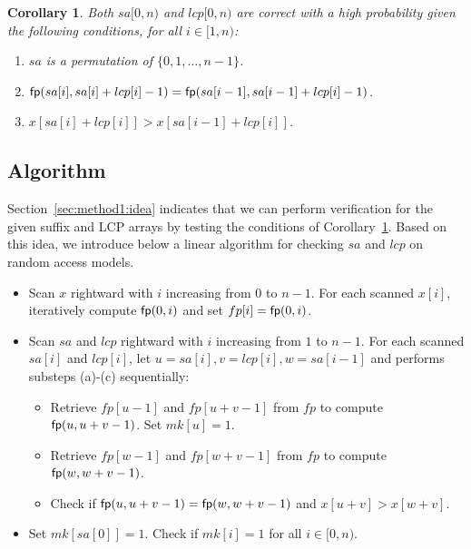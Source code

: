 \documentclass[10pt,journal,compsoc]{IEEEtran}
\newtheorem{Corollary}{Corollary}
\begin{document}
\begin{Corollary} \label{corollary:1}
	Both $sa[0, n)$ and $lcp[0, n)$ are correct with a high probability given the following conditions, for all $i \in [1, n)$:
	
	\begin{enumerate}[(1)]
		\item
		$sa$ is a permutation of $\{0, 1, \dots, n - 1\}$.
		
		\item
		${\sf fp}(sa[i], sa[i] + lcp[i] - 1) = {\sf fp}(sa[i - 1], sa[i - 1] + lcp[i] - 1)$.
		
		\item
		$x[sa[i] + lcp[i]] > x[sa[i - 1] + lcp[i]]$.
	\end{enumerate}
\end{Corollary}


\subsection{Algorithm} \label{sec:method1:algorithm}

Section~\ref{sec:method1:idea} indicates that we can perform verification for the given suffix and LCP arrays by testing the conditions of Corollary~\ref{corollary:1}. Based on this idea, we introduce below a linear algorithm for checking $sa$ and $lcp$ on random access models.

\begin{itemize}
	\item [S1]
	Scan $x$ rightward with $i$ increasing from $0$ to $n - 1$. For each scanned $x[i]$, iteratively compute ${\sf fp}(0, i)$ and set $fp[i] = {\sf fp}(0, i)$.
	
	\item [S2]
	Scan $sa$ and $lcp$ rightward with $i$ increasing from $1$ to $n - 1$. For each scanned $sa[i]$ and $lcp[i]$, let $u = sa[i], v = lcp[i], w = sa[i - 1]$ and performs substeps (a)-(c) sequentially:
	
	\begin{itemize}
		\item [(a)] 
		Retrieve $fp[u - 1]$ and $fp[u + v - 1]$ from $fp$ to compute ${\sf fp}(u, u + v - 1)$. Set $mk[u] = 1$.
		
		\item [(b)] 
		Retrieve $fp[w - 1]$ and $fp[w + v - 1]$ from $fp$ to compute ${\sf fp}(w, w + v - 1)$. 
		
		\item [(c)] 
		Check if ${\sf fp}(u, u + v - 1) = {\sf fp}(w, w + v - 1)$ and $x[u + v] > x[w + v]$.
	\end{itemize}

	\item [S3] Set $mk[sa[0]] = 1$. Check if $mk[i] = 1$ for all $i \in [0, n)$.
	
\end{itemize}
\end{document}

